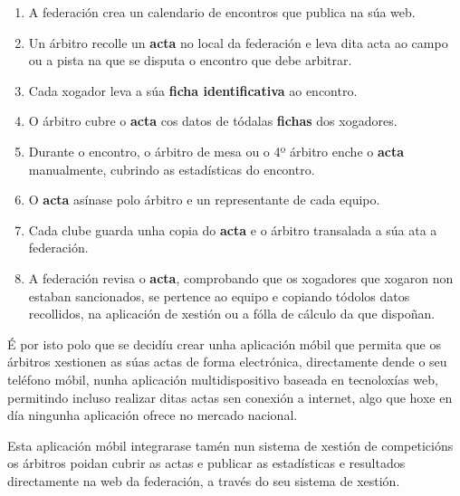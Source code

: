     \begin{enumerate}
     \item A federación crea un calendario de encontros que publica na súa web.
     \item Un árbitro recolle un \textbf{acta} no local da federación e leva dita acta ao 
campo ou a pista na que se disputa o encontro que debe arbitrar.
     \item Cada xogador leva a súa \textbf{ficha identificativa} ao encontro.
     \item O árbitro cubre o \textbf{acta} cos datos de tódalas \textbf{fichas} 
dos xogadores.
     \item Durante o encontro, o árbitro de mesa ou o 4º árbitro enche o \textbf{acta} 
manualmente, cubrindo as estadísticas do encontro.
     \item O \textbf{acta} asínase polo árbitro e un representante de cada equipo.
     \item Cada clube guarda unha copia do \textbf{acta} e o árbitro transalada a súa ata 
a federación.
     \item A federación revisa o \textbf{acta}, comprobando que os xogadores que xogaron 
non estaban sancionados, se pertence ao equipo e copiando tódolos datos recollidos, na 
aplicación de xestión ou a fólla de cálculo da que dispoñan.
    \end{enumerate}
  
  É por isto polo que se decidíu crear unha aplicación móbil que permita que os árbitros 
xestionen as súas actas de forma electrónica, directamente dende o seu teléfono móbil, 
nunha aplicación multidispositivo baseada en tecnoloxías web, permitindo incluso realizar 
ditas actas sen conexión a internet, algo que hoxe en día ningunha aplicación ofrece no 
mercado nacional.

  Esta aplicación móbil integrarase tamén nun sistema de xestión de 
competicións os árbitros poidan cubrir as actas e publicar as estadísticas e 
resultados directamente na web da federación, a través do seu sistema de 
xestión.

